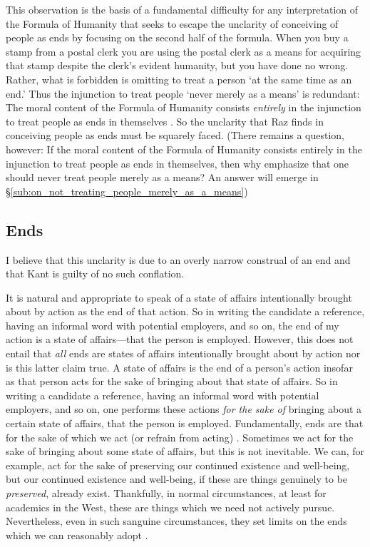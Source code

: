 \documentclass[a4paper,12pt]{article}
\begin{document}
This observation is the basis of a fundamental difficulty for any interpretation of the Formula of Humanity that seeks to escape the unclarity of conceiving of people as ends by focusing on the second half of the formula. When you buy a stamp from a postal clerk you are using the postal clerk as a means for acquiring that stamp despite the clerk's evident humanity, but you have done no wrong. Rather, what is forbidden is omitting to treat a person `at the same time as an end.' Thus the injunction to treat people `never merely as a means' is redundant: The moral content of the Formula of Humanity consists \emph{entirely} in the injunction to treat people as ends in themselves \citep[for further criticism of attempts to derive moral content from the prohibition to treat people merely as a means see][]{Parfit:2008lr}. So the unclarity that Raz finds in conceiving people as ends must be squarely faced. (There remains a question, however: If the moral content of the Formula of Humanity consists entirely in the injunction to treat people as ends in themselves, then why emphasize that one should never treat people merely as a means? An answer will emerge in \S \ref{sub:on_not_treating_people_merely_as_a_means})

\subsection{Ends} \label{sub:ends} %

I believe that this unclarity is due to an overly narrow construal of an end and that Kant is guilty of no such conflation. %

It is natural and appropriate to speak of a state of affairs intentionally brought about by action as the end of that action. So in writing the candidate a reference, having an informal word with potential employers, and so on, the end of my action is a state of affairs---that the person is employed. However, this does not entail that \emph{all} ends are states of affairs intentionally brought about by action nor is this latter claim true. A state of affairs is the end of a person's action insofar as that person acts for the sake of bringing about that state of affairs. So in writing a candidate a reference, having an informal word with potential employers, and so on, one performs these actions \emph{for the sake of} bringing about a certain state of affairs, that the person is employed. Fundamentally, ends are that for the sake of which we act (or refrain from acting) \citep[see, inter alia,][]{Velleman:2006nx}. Sometimes we act for the sake of bringing about some state of affairs, but this is not inevitable. We can, for example, act for the sake of preserving our continued existence and well-being, but our continued existence and well-being, if these are things genuinely to be \emph{preserved}, already exist. Thankfully, in normal circumstances, at least for academics in the West, these are things which we need not actively pursue. Nevertheless, even in such sanguine circumstances, they set limits on the ends which we can reasonably adopt \citep[see][88-94]{Korsgaard:1996md}. 
\end{document}

